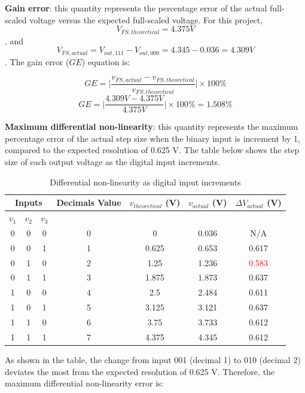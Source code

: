 \documentclass[12pt]{article}
\begin{document}
    \textbf{Gain error}: this quantity represents the percentage error of the actual full-scaled voltage versus the expected full-scaled voltage. For this project, \[V_{FS, theoretical}=4.375V\], and \[V_{FS, actual}=V_{out,111}-V_{out,000}=4.345-0.036=4.309V\]. The gain error (\(GE\)) equation is: 

    \[GE=\Big|\frac{v_{FS,actual}-v_{FS,theoretical}}{v_{FS,theoretical}}\Big| \times 100\%\]
    \[GE=\Big|\frac{4.309V-4.375V}{4.375V}\Big| \times 100\%=1.508\%\]


    \textbf{Maximum differential non-linearity}: this quantity represents the maximum percentage error of the actual step size when the binary input is increment by 1, compared to the expected resolution of 0.625 V. The table below shows the step size of each output voltage as the digital input increments. 

    \begin{table}[H]
        \centering
        \begin{tabular}{|c|c|c|c|c|c|c|}
            \hline
            \multicolumn{3}{|c|}{\textbf{Inputs}} & \textbf{Decimals Value} & \(v_{theoretical}\) (V) & \(v_{actual}\) (V) & \(\Delta V_{actual}\) (V) \\ \hline
            \(v_1\) & \(v_2\) & \(v_3\) &  & & &  \\ \hline
            0 & 0 & 0 & 0 & 0 & 0.036 & N/A \\ \hline
            0 & 0 & 1 & 1 & 0.625 & 0.653 & 0.617 \\ \hline
            0 & 1 & 0 & 2 & 1.25 & 1.236 & \textcolor{red}{0.583}\\ \hline
            0 & 1 & 1 & 3 & 1.875 & 1.873 & 0.637 \\ \hline
            1 & 0 & 0 & 4 & 2.5 & 2.484 & 0.611 \\ \hline
            1 & 0 & 1 & 5 & 3.125 & 3.121 & 0.637 \\ \hline
            1 & 1 & 0 & 6 & 3.75 & 3.733 & 0.612\\ \hline
            1 & 1 & 1 & 7 & 4.375 & 4.345 & 0.612 \\ \hline
        \end{tabular}
        \caption{Differential non-linearity as digital input increments}
    \end{table}

    As shown in the table, the change from input 001 (decimal 1) to 010 (decimal 2) deviates the most from the expected resolution of 0.625 V. Therefore, the maximum differential non-linearity error is: 
\end{document}
